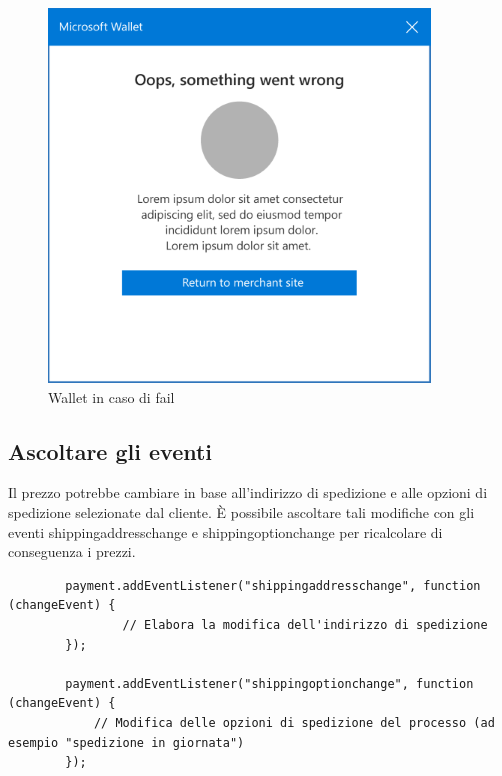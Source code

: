 \documentclass[italian]{article}
\begin{document}
	\begin{figure}[h]
		\centering
		\includegraphics[width=1\linewidth]{wallet3}
		\caption{Wallet in caso di fail}
		\label{fig: Wallet in caso di fail}
	\end{figure}
	\pagebreak
	
	\subsection{Ascoltare gli eventi}
	Il prezzo potrebbe cambiare in base all'indirizzo di spedizione e alle opzioni di spedizione selezionate dal cliente. È possibile ascoltare tali modifiche con gli eventi shippingaddresschange e shippingoptionchange per ricalcolare di conseguenza i prezzi.
	\begin{lstlisting}
		payment.addEventListener("shippingaddresschange", function (changeEvent) {
			    // Elabora la modifica dell'indirizzo di spedizione
		});
		
		payment.addEventListener("shippingoptionchange", function (changeEvent) {
			// Modifica delle opzioni di spedizione del processo (ad esempio "spedizione in giornata")
		});
	\end{lstlisting}
	\pagebreak
	
\end{document}
